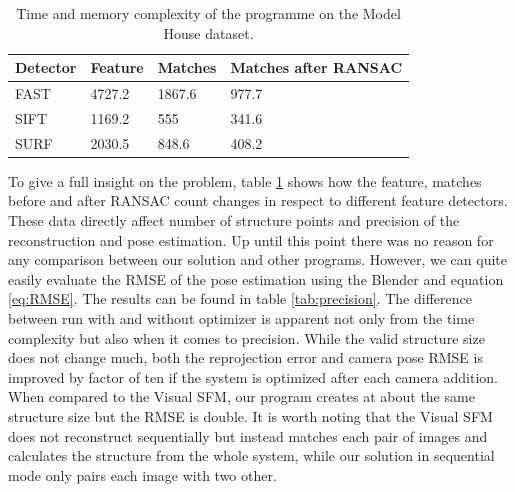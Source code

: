 \begin{table}[!htbp]
	\begin{center}
		\begin{tabular}{| l | l | l | l |}
			\hline
			\textbf{Detector} & \textbf{Feature} &  \textbf{Matches}  & \textbf{Matches after RANSAC}  \\ \hline 
			FAST & 4727.2 & 1867.6 & 977.7 \\ \hline 
			SIFT & 1169.2 & 555 & 341.6 \\ \hline 
			SURF & 2030.5 & 848.6 & 408.2 \\ \hline 
		\end{tabular}
		\caption{Time and memory complexity of the programme on the Model House dataset.}
		\label{tab:keypoints_matches}
	\end{center}
\end{table}

To give a full insight on the problem, table \ref{tab:keypoints_matches} shows how the feature, matches before and after RANSAC count changes in respect to different feature detectors. These data directly affect number of structure points and precision of the reconstruction and pose estimation. Up until this point there was no reason for any comparison between our solution and other programs. However, we can quite easily evaluate the RMSE of the pose estimation using the Blender and equation \ref{eq:RMSE}.  The results can be found in table \ref{tab:precision}. The difference between run with and without optimizer is apparent not only from the time complexity but also when it comes to precision. While the valid structure size does not change much, both the reprojection error and camera pose RMSE is improved by factor of ten if the system is optimized after each camera addition. When compared to the Visual SFM, our program creates at about the same structure size but the RMSE is double. It is worth noting that the Visual SFM does not reconstruct sequentially but instead matches each pair of images and calculates the structure from the whole system, while our solution in sequential mode only pairs each image with two other.

